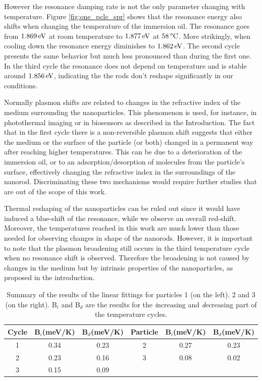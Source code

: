 However the resonance damping rate is not the only parameter changing with
temperature. Figure \ref{fig:one_pcle_spr} shows that the resonance energy also
shifts when changing the temperature of the immersion oil. The resonance goes
from $1.869\,\textrm{eV}$ at room temperature to $1.877\,\textrm{eV}$ at $58\,^o\textrm{C}$. More
strikingly, when cooling down the resonance energy diminishes to $1.862\,\textrm{eV}$. The
second cycle presents the same behavior but much less pronounced than during
the first one. In the third cycle the resonance does not depend on temperature
and is stable around $1.856\,\textrm{eV}$, indicating the the rods don't reshape
significantly in our conditions.

Normally plasmon shifts are related to changes in the refractive index of the
medium surrounding the nanoparticles. This phenomenon is used, for instance, in
photothermal imaging\cite{Berciaud2006,Gaiduk2010b} or in
biosensors\cite{Zijlstra2012} as described in the Introduction. The fact that in
the first cycle there is a non-reversible plasmon shift suggests that either the
medium or the surface of the particle (or both) changed in a permanent way after
reaching higher temperatures. This can be due to a deterioration of the
immersion oil, or to an adsorption/desorption of molecules from the particle's
surface, effectively changing the refractive index in the surroundings of the
nanorod. Discriminating these two mechanisms would require further studies that
are out of the scope of this work. 

Thermal reshaping of the nanoparticles can be ruled out since it would have
induced a blue-shift of the resonance\cite{Liu2009,Horiguchi2008}, while we
observe an overall red-shift. Moreover, the temperatures reached in this work
are much lower than those needed for observing changes in shape of the nanorods.
However, it is important to note that the plasmon broadening still occurs in the
third temperature cycle when no resonance shift is observed. Therefore the
broadening is not caused by changes in the medium but by intrinsic properties of
the nanoparticles, as proposed in the introduction.

\begin{table}
\begin{tabular}{ c | c c || c | c | c}
  Cycle & B$_i$(meV/K) & B$_d$(meV/K) & Particle & B$_i$(meV/K) & B$_d$(meV/K)\\
  \hline
  1 & 0.34 & 0.23 & 2 & 0.27 & 0.23\\
  2 & 0.23 & 0.16 & 3 & 0.08 & 0.02\\
  3 & 0.15 & 0.09 & & \\

\end{tabular}
  \caption{Summary of the results of the linear fittings for particles 1 (on
  the left). 2 and 3 (on the right). B$_i$ and B$_d$ are the results for the
  \textit{i}ncreasing and \textit{d}ecreasing part of the temperature
  cycles.}\label{table-results}
\end{table}

